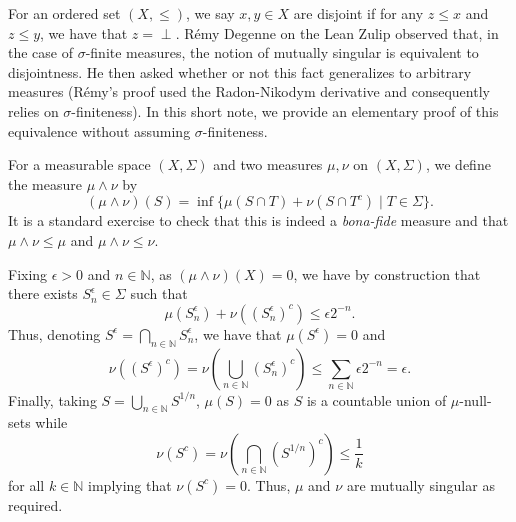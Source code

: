 \documentclass{article}
\begin{document}
For an ordered set \((X, \le)\), we say \(x, y \in X\) are disjoint if for any \(z \le x\) and \(z \le y\),
we have that \(z = \perp\). Rémy Degenne on the Lean Zulip observed that, in the case of \(\sigma\)-finite measures,
the notion of mutually singular is equivalent to disjointness. He then asked whether or not this fact generalizes
to arbitrary measures (Rémy's proof used the Radon-Nikodym derivative and consequently relies on
\(\sigma\)-finiteness). In this short note, we provide an elementary proof of this equivalence without
assuming \(\sigma\)-finiteness.

For a measurable space \((X, \Sigma)\) and two measures \(\mu, \nu\) on \((X, \Sigma)\), we define
the measure \(\mu \wedge \nu\) by
\[(\mu \wedge \nu)(S) = \inf \{\mu(S \cap T) + \nu(S \cap T^c) \mid T \in \Sigma\}.\]
It is a standard exercise to check that this is indeed a \textit{bona-fide} measure and that
\(\mu \wedge \nu \le \mu\) and \(\mu \wedge \nu \le \nu\).

Fixing \(\epsilon > 0\) and \(n \in \mathbb{N}\), as \((\mu \wedge \nu)(X) = 0\),
we have by construction that there exists \(S_n^\epsilon \in \Sigma\) such that
\[\mu(S_n^\epsilon) + \nu((S_n^\epsilon)^c) \le \epsilon 2^{-n}.\]
Thus, denoting \(S^\epsilon = \bigcap_{n \in \mathbb{N}} S_n^\epsilon\), we have that
\(\mu(S^\epsilon) = 0\) and
\[\nu((S^\epsilon)^c) = \nu\left(\bigcup_{n \in \mathbb{N}} (S_n^\epsilon)^c\right)
    \le \sum_{n \in \mathbb{N}}\epsilon 2^{-n} = \epsilon.\]
Finally, taking \(S = \bigcup_{n \in \mathbb{N}} S^{1 / n}\),
\(\mu(S) = 0\) as \(S\) is a countable union of \(\mu\)-null-sets while
\[\nu(S^c) = \nu\left(\bigcap_{n \in \mathbb{N}} (S^{1 / n})^c\right) \le \frac{1}{k}\]
for all \(k \in \mathbb{N}\) implying that \(\nu(S^c) = 0\). Thus, \(\mu\) and \(\nu\) are mutually singular
as required.
\end{document}
